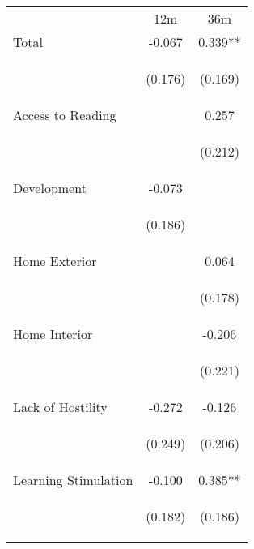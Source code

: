 \begin{tabular}{lcc}
\hline \noalign{\smallskip} & 12m & 36m\\
\noalign{\smallskip}\hline \noalign{\smallskip}Total & -0.067 & 0.339**\\
 & \begin{footnotesize}(0.176)\end{footnotesize} & \begin{footnotesize}(0.169)\end{footnotesize}\\
\noalign{\smallskip}Access to Reading &  & 0.257\\
 & \begin{footnotesize}\end{footnotesize} & \begin{footnotesize}(0.212)\end{footnotesize}\\
\noalign{\smallskip}Development & -0.073 & \\
 & \begin{footnotesize}(0.186)\end{footnotesize} & \begin{footnotesize}\end{footnotesize}\\
\noalign{\smallskip}Home Exterior &  & 0.064\\
 & \begin{footnotesize}\end{footnotesize} & \begin{footnotesize}(0.178)\end{footnotesize}\\
\noalign{\smallskip}Home Interior &  & -0.206\\
 & \begin{footnotesize}\end{footnotesize} & \begin{footnotesize}(0.221)\end{footnotesize}\\
\noalign{\smallskip}Lack of Hostility & -0.272 & -0.126\\
 & \begin{footnotesize}(0.249)\end{footnotesize} & \begin{footnotesize}(0.206)\end{footnotesize}\\
\noalign{\smallskip}Learning Stimulation & -0.100 & 0.385**\\
 & \begin{footnotesize}(0.182)\end{footnotesize} & \begin{footnotesize}(0.186)\end{footnotesize}\\

\end{tabular}
